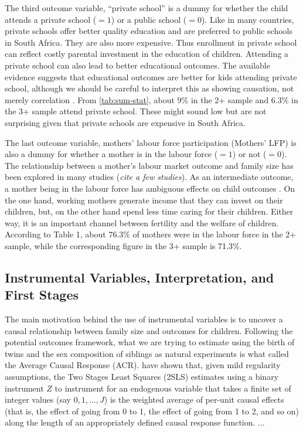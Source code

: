 The third outcome variable, \enquote{private school} is a dummy for whether the child attends a private school ($ = 1 $) or a public school ($ = 0 $). Like in many countries, private schools offer better quality education and are preferred to public schools in South Africa. They are also more expensive. Thus enrollment in private school can reflect costly parental investment in the education of children. Attending a private school can also lead to better educational outcomes. The available evidence suggests that educational outcomes are better for kids attending private school, although we should be careful to interpret this as showing causation, not merely correlation \parencite{caceres-delpiano_impacts_2006}. From \autoref{tab:sum-stat}, about 9\% in the 2+ sample and 6.3\% in the 3+ sample attend private school. These might sound low but are not surprising given that private schools are expensive in South Africa.

The last outcome variable, mothers' labour force participation (Mothers' LFP) is also a dummy for whether a mother is in the labour force ($ =1 $) or not ($ =0 $). The relationship between a mother's labour market outcome and family size has been explored in many studies (\textit{cite a few studies}). As an intermediate outcome, a mother being in the labour force has ambiguous effects on child outcomes \parencite{caceres-delpiano_impacts_2006}. On the one hand, working mothers generate income that they can invest on their children, but, on the other hand spend less time caring for their children. Either way, it is an important channel between fertility and the welfare of children. According to Table 1, about 76.3\% of mothers were in the labour force in the 2+ sample, while the corresponding figure in the 3+ sample is 71.3\%.


\subsection{Instrumental Variables, Interpretation, and First Stages}
\label{section:IVs}

The main motivation behind the use of instrumental variables is to uncover a causal relationship between family size and outcomes for children. Following the potential outcomes framework, what we are trying to estimate using the birth of twins and the sex composition of siblings as natural experiments is what \textcite{Angrist1995} called the Average Causal Response (ACR). \textcite{Angrist1995} have shown that, given mild regularity assumptions, the Two Stages Least Squares (2SLS) estimates using a binary instrument $ Z $ to instrument for an endogenous variable that takes a finite set of integer values  (say $ 0, 1, \dots, J $) is the weighted average of per-unit causal effects (that is, the effect of going from 0 to 1, the effect of going from 1 to 2, and so on) along the length of an appropriately defined causal response function. ...

